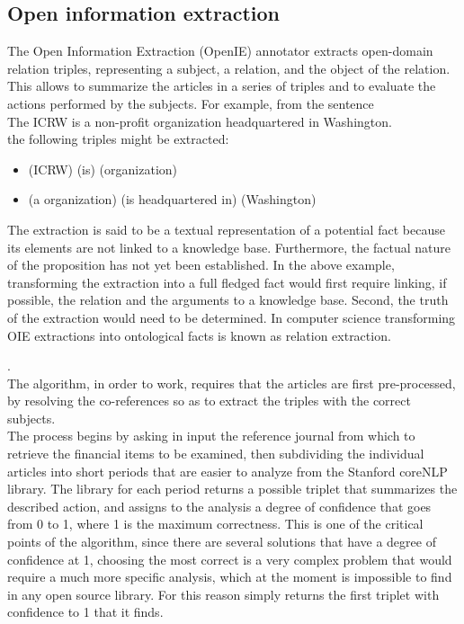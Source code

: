\subsection{Open information extraction}
\par 
The Open Information Extraction (OpenIE) annotator extracts open-domain relation triples, representing a subject, a relation, and the object of the relation. This allows to summarize the articles in a series of triples and to evaluate the actions performed by the subjects. 
For example, from the sentence\\
The ICRW is a non-profit organization headquartered in Washington.\\
the following triples might be extracted:
\begin{itemize}
\item
(ICRW) (is) (organization)
\item
(a organization) (is headquartered in) (Washington)
\end{itemize}
The extraction is said to be a textual representation of a potential fact because its elements are not linked to a knowledge base. Furthermore, the factual nature of the proposition has not yet been established. In the above example, transforming the extraction into a full fledged fact would first require linking, if possible, the relation and the arguments to a knowledge base. Second, the truth of the extraction would need to be determined. In computer science transforming OIE extractions into ontological facts is known as relation extraction.
\par 
\cite{openIEwiki}. \\
The algorithm, in order to work, requires that the articles are first pre-processed, by resolving the co-references so as to extract the triples with the correct subjects. \\
The process begins by asking in input the reference journal from which to retrieve the financial items to be examined, then subdividing the individual articles into short periods that are easier to analyze from the Stanford coreNLP library. The library for each period returns a possible triplet that summarizes the described action, and assigns to the analysis a degree of confidence that goes from 0 to 1, where 1 is the maximum correctness. This is one of the critical points of the algorithm, since there are several solutions that have a degree of confidence at 1, choosing the most correct is a very complex problem that would require a much more specific analysis, which at the moment is impossible to find in any open source library. For this reason simply returns the first triplet with confidence to 1 that it finds.
